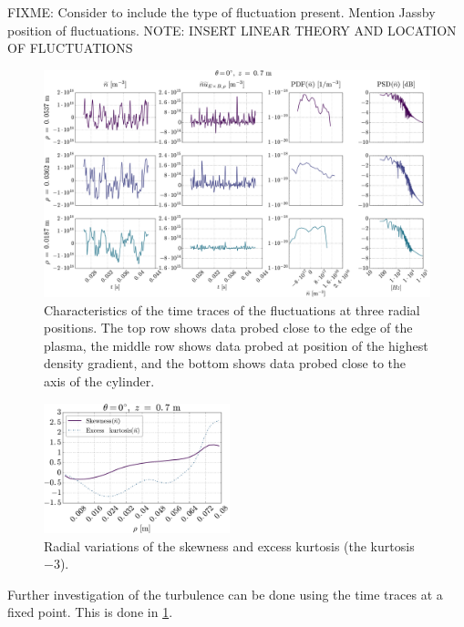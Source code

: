 FIXME: Consider to include the type of fluctuation present.
Mention Jassby position of fluctuations.
NOTE: INSERT LINEAR THEORY AND LOCATION OF FLUCTUATIONS
%
\begin{figure}[htb]
    \centering
    \includegraphics[width=1.0\textwidth]{fig/results/combinedPlots/008T}
    \caption{Characteristics of the time traces of the fluctuations at three radial positions.
        The top row shows data probed close to the edge of the plasma,
        the middle row shows data probed at position of the highest density gradient,
        and the bottom shows data probed close to the axis of the cylinder.
    }
    \label{fig:combinedPlots008}
\end{figure}
%
%
\begin{figure}
    \begin{center}
        \includegraphics[width=0.48\textwidth]{fig/results/skewKurt/008T}
    \end{center}
    \caption{Radial variations of the skewness and excess kurtosis (the kurtosis $-3$).}
    \label{fig:skewKurt008}
\end{figure}
%
Further investigation of the turbulence can be done using the time traces at a fixed point.
This is done in \cref{fig:combinedPlots008}.

